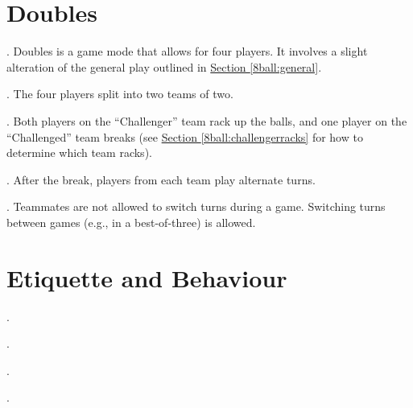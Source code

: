 \section{Doubles} \label{8ball:doubles}
\ex. Doubles is a game mode that allows for four players. It involves a slight alteration of the general play outlined in \hyperref[8ball:general]{Section \ref*{8ball:general}}.\par
\ex. The four players split into two teams of two.\par
\ex. Both players on the “Challenger” team rack up the balls, and one player on the “Challenged” team breaks (see \hyperref[8ball:challengerracks]{Section \ref*{8ball:challengerracks}} for how to determine which team racks).\par
\ex. After the break, players from each team play alternate turns.\par
\ex. Teammates are not allowed to switch turns during a game. Switching turns between games (e.g., in a best-of-three) is allowed.\par

\section{Etiquette and Behaviour} \label{8ball:etiquette}  %
\ex. \label{8ball:misleading}\Misleading\par
\ex. \DistractingWhileSettingUp\par
\ex. \DistractingWhileStriking\par
\ex. \label{8ball:sportsmanship}\Sportsmanship\par


